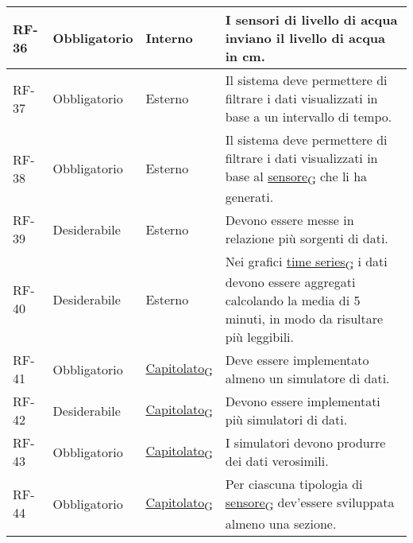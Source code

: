 \begin{longtable}{|>{\centering\arraybackslash}m{}|>{\centering\arraybackslash}m{}|>{\centering\arraybackslash}m{}|>{\centering\arraybackslash}m{}|}
	\\\hline
	RF-36           & Obbligatorio        & Interno                                                                                                           & I sensori di livello di acqua inviano il livello di acqua in cm.
	\\\hline
	RF-37           & Obbligatorio        & Esterno                                                                                                           & Il sistema deve permettere di filtrare i dati visualizzati in base a un intervallo di tempo.
	\\\hline
	RF-38           & Obbligatorio        & Esterno                                                                                                           & Il sistema deve permettere di filtrare i dati visualizzati in base al \href{https://7last.github.io/docs/pb/documentazione-interna/glossario\#sensore}{sensore\textsubscript{G}} che li ha generati.
	\\\hline
	RF-39           & Desiderabile        & Esterno                                                                                                           & Devono essere messe in relazione più sorgenti di dati.
	\\\hline
	RF-40           & Desiderabile        & Esterno                                                                                                           & Nei grafici \href{https://7last.github.io/docs/pb/documentazione-interna/glossario\#time-series}{time series\textsubscript{G}} i dati devono essere aggregati calcolando la media di 5 minuti, in modo da risultare più leggibili.
	\\\hline
	RF-41           & Obbligatorio        & \href{https://7last.github.io/docs/pb/documentazione-interna/glossario\#capitolato}{Capitolato\textsubscript{G}} & Deve essere implementato almeno un simulatore di dati.
	\\\hline
	RF-42           & Desiderabile        & \href{https://7last.github.io/docs/pb/documentazione-interna/glossario\#capitolato}{Capitolato\textsubscript{G}} & Devono essere implementati più simulatori di dati.
	\\\hline
	RF-43           & Obbligatorio        & \href{https://7last.github.io/docs/pb/documentazione-interna/glossario\#capitolato}{Capitolato\textsubscript{G}} & I simulatori devono produrre dei dati verosimili.
	\\\hline
	RF-44           & Obbligatorio        & \href{https://7last.github.io/docs/pb/documentazione-interna/glossario\#capitolato}{Capitolato\textsubscript{G}} & Per ciascuna tipologia di \href{https://7last.github.io/docs/pb/documentazione-interna/glossario\#sensore}{sensore\textsubscript{G}} dev'essere sviluppata almeno una sezione.

\end{longtable}
